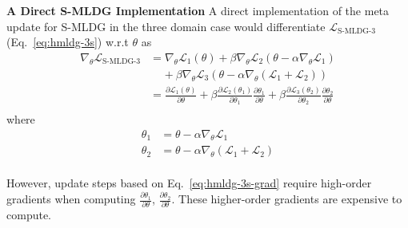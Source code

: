 \documentclass[runningheads]{llncs}
\newcommand{\cut}[1]{}
\newcommand{\nameS}{S-MLDG}
\newcommand{\keypoint}[1]{\vspace{0.1cm}\noindent\textbf{#1}\quad}
\begin{document}
\keypoint{A Direct \nameS{} Implementation}
A direct implementation of the meta update for \nameS{} in the three domain case would differentiate $ \mathcal{L}_{\text{\nameS{}-3}}$ (Eq.~\ref{eq:hmldg-3s}) w.r.t $\theta$ as
\small
\begin{equation}
\begin{aligned}
\label{eq:hmldg-3s-grad}
\nabla_\theta\mathcal{L}_{\text{\nameS{}-3}} & = \nabla_\theta\mathcal{L}_1(\theta) + \beta\nabla_\theta\mathcal{L}_2(\theta-\alpha\nabla_\theta\mathcal{L}_1) \\
& ~~~~~ + \beta\nabla_\theta\mathcal{L}_3(\theta-\alpha\nabla_\theta(\mathcal{L}_1 +\mathcal{L}_2)) \\
 & = \frac{\partial \mathcal{L}_1(\theta)}{\partial \theta} + \beta \frac{\partial \mathcal{L}_2(\theta_1)}{\partial \theta_1}\frac{\partial \theta_1}{\partial \theta} + \beta\frac{\partial \mathcal{L}_3(\theta_2)}{\partial \theta_2}\frac{\partial \theta_2}{\partial \theta} \\
\end{aligned}
\end{equation}
\normalsize
where
\small
\begin{equation}
\label{eq:theta1}
\begin{aligned}
\theta_1&= \theta - \alpha\nabla_\theta\mathcal{L}_1\\
\cut{\end{aligned}
\end{equation}
\normalsize
and
\small
\begin{equation}
\label{eq:theta2}
\begin{aligned}}
\theta_2 &= \theta-\alpha\nabla_\theta(\mathcal{L}_1 +\mathcal{L}_2) \\
\end{aligned}
\end{equation}
\normalsize



\noindent However, update steps based on Eq.~\ref{eq:hmldg-3s-grad} require high-order gradients when computing $\frac{\partial \theta_1}{\partial \theta}$, $\frac{\partial \theta_2}{\partial \theta} $. These higher-order gradients are expensive to compute. 
\end{document}
